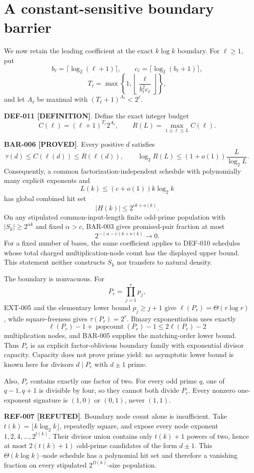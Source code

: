 \documentclass[11pt]{article}
\newcommand{\claimstatus}[2]{\textbf{#1 [#2]}}
\begin{document}
\section{A constant-sensitive boundary barrier}

We now retain the leading coefficient at the exact \(k\log k\) boundary.
For \(\ell\ge1\), put
\[
b_\ell=\lceil\log_2(\ell+1)\rceil,\qquad
c_\ell=\lceil\log_2(b_\ell+1)\rceil,
\]
\[
T_\ell=\max\left\{1,
\left\lfloor\frac{\ell}{b_\ell^2c_\ell}\right\rfloor\right\},
\]
and let \(A_\ell\) be maximal with
\((T_\ell+1)^{A_\ell}<2^\ell\).

\claimstatus{DEF-011}{DEFINITION}. Define the exact integer budget
\[
C(\ell)=(\ell+1)^{T_\ell}2^{A_\ell},\qquad
R(L)=\max_{1\le\ell\le L}C(\ell).
\]

\claimstatus{BAR-006}{PROVED}. Every positive \(d\) satisfies
\[
\tau(d)\le C(\ell(d))\le R(\ell(d)),\qquad
\log_2R(L)\le(1+o(1))\frac{L}{\log_2L}.
\]
Consequently, a common factorization-independent schedule with polynomially
many explicit exponents and
\[
L(k)\le(c+o(1))k\log_2k
\]
has global combined hit set
\[
|H(k)|\le2^{ck+o(k)}.
\]
On any stipulated common-input-length finite odd-prime population with
\(|S_k|\ge2^{\alpha k}\) and fixed \(\alpha>c\), BAR-003 gives promised-pair
fraction at most
\[
2^{-(\alpha-c)k+o(k)}\longrightarrow0.
\]
For a fixed number of bases, the same coefficient applies to DEF-010 schedules
whose total charged multiplication-node count has the displayed upper bound.
This statement neither constructs \(S_k\) nor transfers to natural density.

The boundary is nonvacuous. For
\[
P_r=\prod_{j=1}^r p_j,
\]
EXT-005 and the elementary lower bound \(p_j\ge j+1\) give
\(\ell(P_r)=\Theta(r\log r)\), while square-freeness gives
\(\tau(P_r)=2^r\). Binary exponentiation uses exactly
\[
\ell(P_r)-1+\operatorname{popcount}(P_r)-1
\le2\ell(P_r)-2
\]
multiplication nodes, and BAR-005 supplies the matching-order lower bound.
Thus \(P_r\) is an explicit factor-oblivious boundary family with exponential
divisor capacity. Capacity does not prove prime yield: no asymptotic lower
bound is known here for divisors \(d\mid P_r\) with \(d\pm1\) prime.

Also, \(P_r\) contains exactly one factor of two. For every odd prime \(q\),
one of \(q-1,q+1\) is divisible by four, so they cannot both divide \(P_r\).
Every nonzero one-exponent signature is \((1,0)\) or \((0,1)\), never
\((1,1)\).

\claimstatus{REF-007}{REFUTED}. Boundary node count alone is insufficient.
Take \(t(k)=\lfloor k\log_2k\rfloor\), repeatedly square, and expose every
node exponent \(1,2,4,\ldots,2^{t(k)}\). Their
divisor union contains only \(t(k)+1\) powers of two, hence at most
\(2(t(k)+1)\) odd-prime candidates of the form \(d\pm1\). This
\(\Theta(k\log k)\)-node schedule has a polynomial hit set and therefore a
vanishing fraction on every stipulated \(2^{\Omega(k)}\)-size population.
\end{document}
